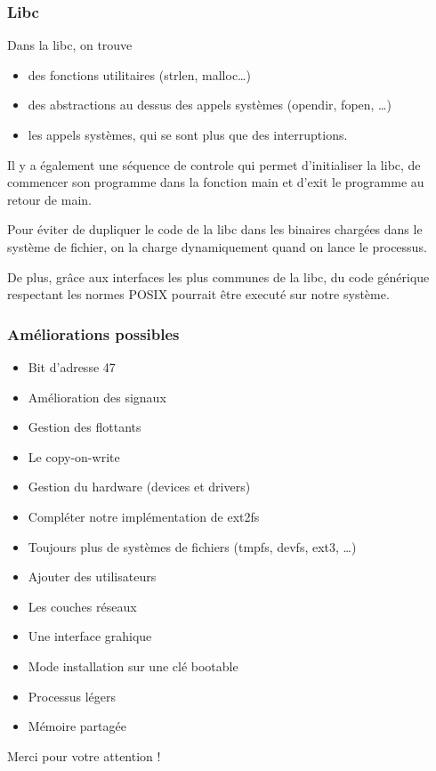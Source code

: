 \documentclass[10pt,a4paper]{beamer}
\begin{document}
\begin{frame}
  \frametitle{Libc}
  Dans la libc, on trouve
  \begin{itemize}
  \item des fonctions utilitaires (\textrm{strlen}, \textrm{malloc}\ldots)
  \item des abstractions au dessus des appels systèmes (\textrm{opendir}, \textrm{fopen}, \ldots)
  \item les appels systèmes, qui se sont plus que des interruptions.
  \end{itemize}

  Il y a également une séquence de controle qui permet d'initialiser la libc, de commencer son programme dans la fonction \textrm{main} et d'\textrm{exit} le programme au retour  de \textrm{main}.

  Pour éviter de dupliquer le code de la libc dans les binaires chargées dans le système de fichier, on la charge dynamiquement quand on lance le processus.

  De plus, grâce aux interfaces les plus communes de la libc, du code générique respectant les normes \textrm{POSIX} pourrait être executé sur notre système.

\end{frame}

\begin{frame}
  \frametitle{Améliorations possibles}
  \begin{itemize}
  \item Bit d'adresse 47
  \item Amélioration des signaux
  \item Gestion des flottants
  \item Le copy-on-write
  \item Gestion du hardware (devices et drivers)
  \item Compléter notre implémentation de ext2fs
  \item Toujours plus de systèmes de fichiers (tmpfs, devfs, ext3, \ldots)
  \item Ajouter des utilisateurs
  \item Les couches réseaux
  \item Une interface grahique
  \item Mode installation sur une clé bootable
  \item Processus légers
  \item Mémoire partagée
  \end{itemize}

  \thinspace{}
  \begin{center}
    \large{Merci pour votre attention !}
  \end{center}

\end{frame}
\end{document}
